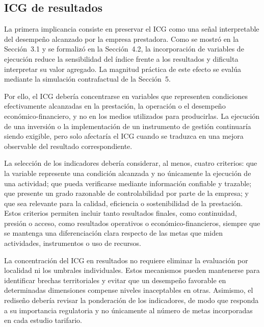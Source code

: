 \subsection{ICG de resultados}

La primera implicancia consiste en preservar el ICG como una señal interpretable del desempeño alcanzado por la empresa prestadora. Como se mostró en la Sección~3.1 y se formalizó en la Sección~4.2, la incorporación de variables de ejecución reduce la sensibilidad del índice frente a los resultados y dificulta interpretar su valor agregado. La magnitud práctica de este efecto se evalúa mediante la simulación contrafactual de la Sección~5.

Por ello, el ICG debería concentrarse en variables que representen condiciones efectivamente alcanzadas en la prestación, la operación o el desempeño económico-financiero, y no en los medios utilizados para producirlas. La ejecución de una inversión o la implementación de un instrumento de gestión continuaría siendo exigible, pero solo afectaría el ICG cuando se traduzca en una mejora observable del resultado correspondiente.

La selección de los indicadores debería considerar, al menos, cuatro criterios: que la variable represente una condición alcanzada y no únicamente la ejecución de una actividad; que pueda verificarse mediante información confiable y trazable; que presente un grado razonable de controlabilidad por parte de la empresa; y que sea relevante para la calidad, eficiencia o sostenibilidad de la prestación. Estos criterios permiten incluir tanto resultados finales, como continuidad, presión o acceso, como resultados operativos o económico-financieros, siempre que se mantenga una diferenciación clara respecto de las metas que miden actividades, instrumentos o uso de recursos.

La concentración del ICG en resultados no requiere eliminar la evaluación por localidad ni los umbrales individuales. Estos mecanismos pueden mantenerse para identificar brechas territoriales y evitar que un desempeño favorable en determinadas dimensiones compense niveles inaceptables en otras. Asimismo, el rediseño debería revisar la ponderación de los indicadores, de modo que responda a su importancia regulatoria y no únicamente al número de metas incorporadas en cada estudio tarifario.

